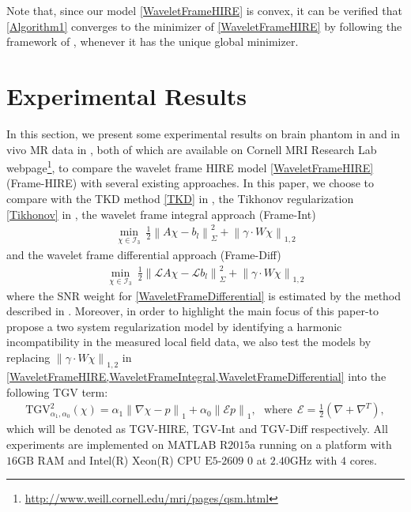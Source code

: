 \documentclass[reqno]{siamonline1116}
\numberwithin{theorem}{section}
\numberwithin{equation}{section}
\def\f{\frac}
\def\na{\nabla}
\def\mE{{\mathcal E}}
\def\mI{{\mathcal I}}
\def\msL{{\mathscr L}}
\begin{document}
Note that, since our model \cref{WaveletFrameHIRE} is convex, it can be verified that \cref{Algorithm1} converges to the minimizer of \cref{WaveletFrameHIRE} by following the framework of \cite[Theorem 3.2.]{J.F.Cai2009/10}, whenever it has the unique global minimizer.

\section{Experimental Results}\label{Experiments}

In this section, we present some experimental results on brain phantom in \cite{C.Wisnieff2013} and in vivo MR data in \cite{Y.Wang2015}, both of which are available on Cornell MRI Research Lab webpage\footnote{\href{}{http://www.weill.cornell.edu/mri/pages/qsm.html}}, to compare the wavelet frame HIRE model \cref{WaveletFrameHIRE} (Frame-HIRE) with several existing approaches. In this paper, we choose to compare with the TKD method \cref{TKD} in \cite{K.Shmueli2009}, the Tikhonov regularization \cref{Tikhonov} in \cite{B.Kressler2010}, the wavelet frame integral approach (Frame-Int)
\begin{align}\label{WaveletFrameIntegral}
\min_{\chi\in\mI_3}~\f{1}{2}\left\|A\chi-b_l\right\|_{\Sigma}^2+\left\|\gamma\cdot W\chi\right\|_{1,2}
\end{align}
and the wavelet frame differential approach (Frame-Diff)
\begin{align}\label{WaveletFrameDifferential}
\min_{\chi\in\mI_3}~\f{1}{2}\left\|\msL A\chi-\msL b_l\right\|_{\Sigma}^2+\left\|\gamma\cdot W\chi\right\|_{1,2}
\end{align}
where the SNR weight for \cref{WaveletFrameDifferential} is estimated by the method described in \cite{Y.Kee2017}. Moreover, in order to highlight the main focus of this paper-to propose a two system regularization model by identifying a harmonic incompatibility in the measured local field data, we also test the models by replacing $\left\|\gamma\cdot W\chi\right\|_{1,2}$ in \cref{WaveletFrameHIRE,WaveletFrameIntegral,WaveletFrameDifferential} into the following TGV term:
\begin{align}\label{TGVTerm}
\mathrm{TGV}_{\alpha_1,\alpha_0}^2(\chi)=\alpha_1\left\|\na\chi-p\right\|_1+\alpha_0\left\|\mE p\right\|_1,~~~\text{where}~~\mE=\f{1}{2}\left(\na+\na^T\right),
\end{align}
which will be denoted as TGV-HIRE, TGV-Int and TGV-Diff respectively. All experiments are implemented on MATLAB $\mathrm{R}2015\mathrm{a}$ running on a platform with $16\mathrm{GB}$ RAM and Intel(R) Xeon(R) CPU $\mathrm{E}5$-$2609$ $0$ at $2.40\mathrm{GHz}$ with $4$ cores.
\end{document}
